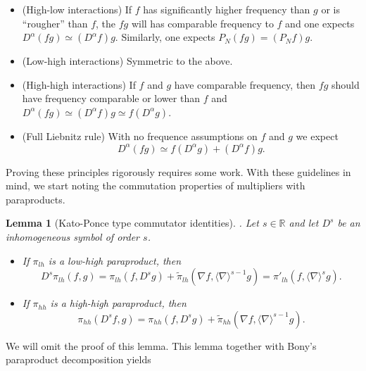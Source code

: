 \documentclass[11pt]{article}
\newtheorem{lem}[thm]{Lemma}
\theoremstyle{remark}
\newcommand{\1}{\textbf{1}}
\def\brac#1{\langle #1  \rangle}
\newcommand{\bbR}{\mathbb{R}}
\begin{document}
\begin{itemize}
\item (High-low interactions) If $f$ has significantly higher frequency than $g$ or is ``rougher'' than $f$, the $fg$ will has comparable frequency to $f$ and one expects $D^\alpha(fg) \simeq (D^\alpha f) g$. Similarly, one expects $P_N(fg) = (P_N f )g$.
\item (Low-high interactions) Symmetric to the above.
\item (High-high interactions) If $f$ and $g$ have comparable frequency, then $fg$ should have frequency comparable or lower than $f$ and $D^\alpha(fg) \simeq (D^\alpha f) g \simeq f (D^\alpha g)$.
\item (Full Liebnitz rule) With no frequence assumptions on $f$ and $g$ we expect
\[
D^\alpha(fg) \simeq f (D^\alpha g) + (D^\alpha f) g.
\]
\end{itemize}
Proving these principles rigorously requires some work. With these guidelines in mind, we start noting the commutation properties of multipliers with paraproducts.

\begin{lem}[Kato-Ponce type commutator identities]. Let $s \in \bbR$ and let $D^s$ be an inhomogeneous symbol of order $s$.
\begin{itemize}
\item If $\pi_{lh}$ is a low-high paraproduct, then 
\[
D^s \pi_{lh}(f,g) = \pi_{lh}(f,D^s g) + \tilde{\pi}_{lh}(\nabla f, \brac{\nabla}^{s-1} g) = \pi'_{lh}(f, \brac{\nabla}^s g).
\]
\item If $\pi_{hh}$ is a high-high paraproduct, then
\[
\pi_{hh}(D^sf,g) = \pi_{hh}(f,D^sg) + \tilde{\pi}_{hh}(\nabla f, \brac{\nabla}^{s-1} g).
\]
\end{itemize}
\end{lem}
We will omit the proof of this lemma. This lemma together with Bony's paraproduct decomposition yields
\end{document}

